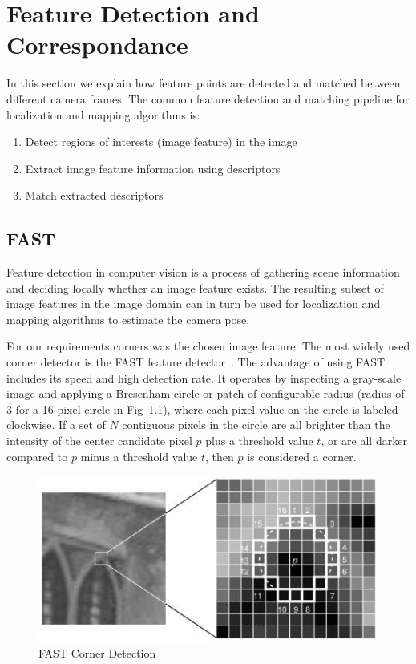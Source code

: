 \chapter{Feature Detection and Correspondance}

In this section we explain how feature points are detected and matched between
different camera frames. The common feature detection and matching pipeline for
localization and mapping algorithms is:

\begin{enumerate}
  \setlength{\itemsep}{0pt}
  \setlength{\parskip}{0pt}
  \setlength{\parsep}{0pt}
  \item{Detect regions of interests (image feature) in the image}
  \item{Extract image feature information using descriptors}
  \item{Match extracted descriptors}
\end{enumerate}



\section{FAST}
\label{sec:fast}

Feature detection in computer vision is a process of gathering scene
information and deciding locally whether an image feature exists. The resulting
subset of image features in the image domain can in turn be used for
localization and mapping algorithms to estimate the camera pose.

For our requirements corners was the chosen image feature. The most widely used
corner detector is the FAST feature detector~\cite{Rosten2006}. The advantage
of using FAST includes its speed and high detection rate. It operates by
inspecting a gray-scale image and applying a Bresenham circle or patch of
configurable radius (radius of 3 for a 16 pixel circle in
Fig~\ref{fig:fast_corner}), where each pixel value on the circle is labeled
clockwise. If a set of $N$ contiguous pixels in the circle are all brighter
than the intensity of the center candidate pixel $p$ plus a threshold value
$t$, or are all darker compared to $p$ minus a threshold value $t$, then $p$ is
considered a corner.

\begin{figure}[h]
  \centering
  \includegraphics[width=0.6\linewidth]{images/feature/fast.jpg}
  \caption{FAST Corner Detection~\cite{Rosten2006}}
  \label{fig:fast_corner}
\end{figure}

